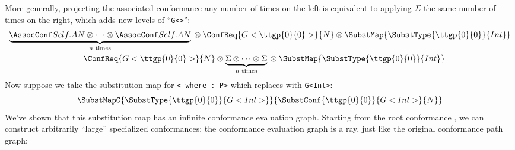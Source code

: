\documentclass[../generics]{subfiles}
\begin{document}
More generally, projecting the associated conformance any number of times on the left is equivalent to applying $\Sigma$ the same number of times on the right, which adds new levels of ``\texttt{G<>}'':
\begin{gather*}
\underbrace{\SelfAToN\otimes\cdots\otimes\SelfAToN}_{\textrm{$n$ times}}{} \otimes\ConfReq{G<\ttgp{0}{0}>}{N}\otimes \SubstMap{\SubstType{\ttgp{0}{0}}{Int}}\\
= \ConfReq{G<\ttgp{0}{0}>}{N}\otimes \underbrace{\Sigma\otimes\cdots\otimes \Sigma}_{\textrm{$n$ times}}{} \otimes \SubstMap{\SubstType{\ttgp{0}{0}}{Int}}
\end{gather*}
Now suppose we take the substitution map for \texttt{< where :\ P>} which replaces  with \texttt{G<Int>}:
\[\SubstMapC{\SubstType{\ttgp{0}{0}}{G<Int>}}{\SubstConf{\ttgp{0}{0}}{G<Int>}{N}}\]
We've shown that this substitution map has an infinite conformance evaluation graph. Starting from the root conformance , we can construct arbitrarily ``large'' specialized conformances; the conformance evaluation graph is a ray, just like the original conformance path graph:
\begin{quote}
\end{quote}
\end{document}
